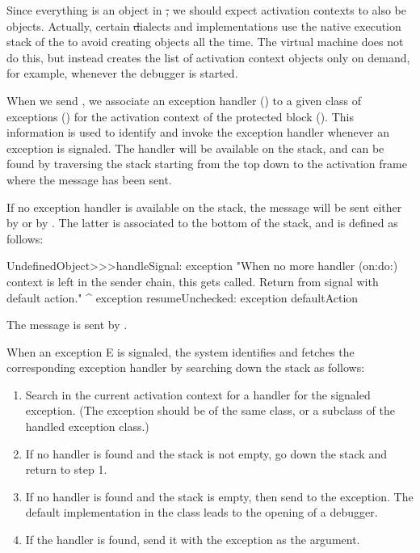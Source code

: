 \documentclass[a4paper,10pt,twoside]{book}
\begin{document}
Since everything is an object in \st, we should expect activation contexts to also be objects.
Actually, certain \st dialects and implementations use the native  execution stack of the  to avoid creating objects all the time.
The \pharo virtual machine does not do this, but instead creates the list of activation context objects only on demand, for example, whenever the debugger is started.

When we send , we associate an exception handler () to a given class of exceptions () for the activation context of the protected block ().
This information is used to identify and invoke the exception handler whenever an exception is signaled. The handler will be available on the stack, and can be found by traversing the stack starting from the top down to the activation frame where the  message has been sent.


If no exception handler is available on the stack, the message  will be sent either by  or by . The latter is associated to the bottom of the stack, and is defined as follows:

\begin{code}
UndefinedObject>>>handleSignal: exception
	"When no more handler (on:do:) context is left in the sender chain, this gets called.  Return from signal with default action."
	^ exception resumeUnchecked: exception defaultAction
\end{code}

The message  is sent by . 

When an exception E is signaled, the system identifies and fetches the corresponding exception handler by searching down the stack as follows:

\begin{enumerate}

\item Search in the current activation context for a handler for the signaled exception.
(The exception should be of the same class, or a subclass of the handled exception class.)

\item If no handler is found and the stack is not empty, go down the stack and return to step 1.

\item If no handler is found and the stack is empty, then send  to the exception. The default implementation in the  class leads to the opening of a debugger.

\item If the handler is found, send it  with the exception as the argument.

\end{enumerate}
\end{document}
